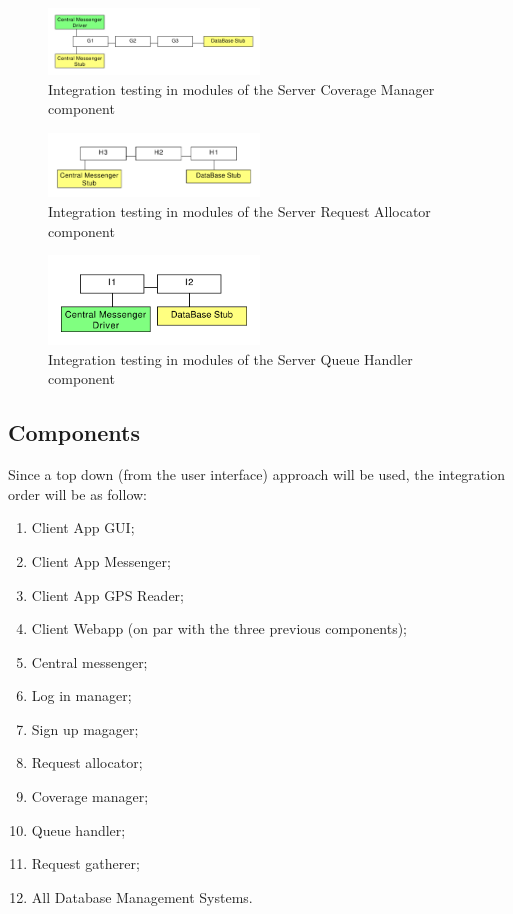 \begin{figure}
\centering
\includegraphics[width=0.5\textwidth]{tex-images/mod-7}
\caption{Integration testing in modules of the Server Coverage Manager component}
\end{figure}

\begin{figure}
\centering
\includegraphics[width=0.5\textwidth]{tex-images/mod-8}
\caption{Integration testing in modules of the Server Request Allocator component}
\end{figure}

\begin{figure}
\centering
\includegraphics[width=0.5\textwidth]{tex-images/mod-9}
\caption{Integration testing in modules of the Server Queue Handler component}
\end{figure}


\subsection{Components}
Since a top down (from the user interface) approach will be used, the integration order will be as follow:
\begin{enumerate}
\item Client App GUI;
\item Client App Messenger;
\item Client App GPS Reader;
\item Client Webapp (on par with the three previous components);
\item Central messenger;
\item Log in manager;
\item Sign up magager;
\item Request allocator;
\item Coverage manager;
\item Queue handler;
\item Request gatherer;
\item All Database Management Systems.
\end{enumerate}

